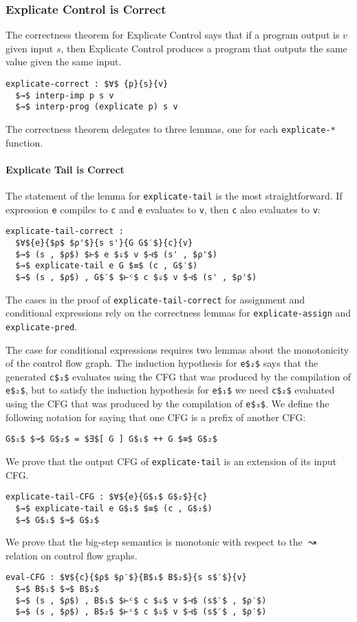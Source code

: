 \documentclass[sigplan,screen]{acmart}
\begin{document}
\subsubsection{Explicate Control is Correct}

The correctness theorem for Explicate Control says that if a program
output is $v$ given input $s$, then Explicate Control produces a
program that outputs the same value given the same input.

\begin{lstlisting}
explicate-correct : $∀$ {p}{s}{v}
  $→$ interp-imp p s v
  $→$ interp-prog (explicate p) s v
\end{lstlisting}

The correctness theorem delegates to three lemmas, one for each
\lstinline{explicate-*} function.

\paragraph{Explicate Tail is Correct}

The statement of the lemma for \lstinline{explicate-tail} is the most
straightforward. If expression \lstinline{e} compiles to
\lstinline{c} and \lstinline{e} evaluates to \lstinline{v}, then
\lstinline{c} also evaluates to \lstinline{v}:
\begin{lstlisting}
explicate-tail-correct :
  $∀${e}{$ρ$ $ρ'$}{s s'}{G G$′$}{c}{v}
  $→$ (s , $ρ$) $⊢$ e $⇓$ v $⊣$ (s' , $ρ'$)
  $→$ explicate-tail e G $≡$ (c , G$′$)
  $→$ (s , $ρ$) , G$′$ $⊢ᶜ$ c $⇓$ v $⊣$ (s' , $ρ'$)
\end{lstlisting}
\noindent The cases in the proof of \lstinline{explicate-tail-correct}
for assignment and conditional expressions rely on the correctness
lemmas for \lstinline{explicate-assign} and
\lstinline{explicate-pred}.

The case for conditional expressions requires two lemmas about the
monotonicity of the control flow graph.  The induction hypothesis for
\lstinline{e$₂$} says that the generated \lstinline{c$₂$} evaluates
using the CFG that was produced by the compilation of
\lstinline{e$₂$}, but to satisfy the induction hypothesis
for \lstinline{e$₁$} we need \lstinline{c$₂$} evaluated using the CFG
that was produced by the compilation of \lstinline{e$₃$}.
We define the following notation for
saying that one CFG is a prefix of another CFG:
\begin{lstlisting}
G$₁$ $↝$ G$₂$ = $∃$[ G ] G$₁$ ++ G $≡$ G$₂$
\end{lstlisting}
\noindent We prove that the output CFG of \lstinline{explicate-tail} is
an extension of its input CFG.
\begin{lstlisting}
explicate-tail-CFG : $∀${e}{G$₁$ G$₂$}{c}
  $→$ explicate-tail e G$₁$ $≡$ (c , G$₂$)
  $→$ G$₁$ $↝$ G$₂$
\end{lstlisting}
\noindent We prove that the big-step semantics is monotonic with
respect to the $↝$ relation on control flow graphs.
\begin{lstlisting}
eval-CFG : $∀${c}{$ρ$ $ρ′$}{B$₁$ B$₂$}{s s$′$}{v}
  $→$ B$₁$ $↝$ B$₂$
  $→$ (s , $ρ$) , B$₁$ $⊢ᶜ$ c $⇓$ v $⊣$ (s$′$ , $ρ′$)
  $→$ (s , $ρ$) , B$₂$ $⊢ᶜ$ c $⇓$ v $⊣$ (s$′$ , $ρ′$)
\end{lstlisting}
\end{document}
